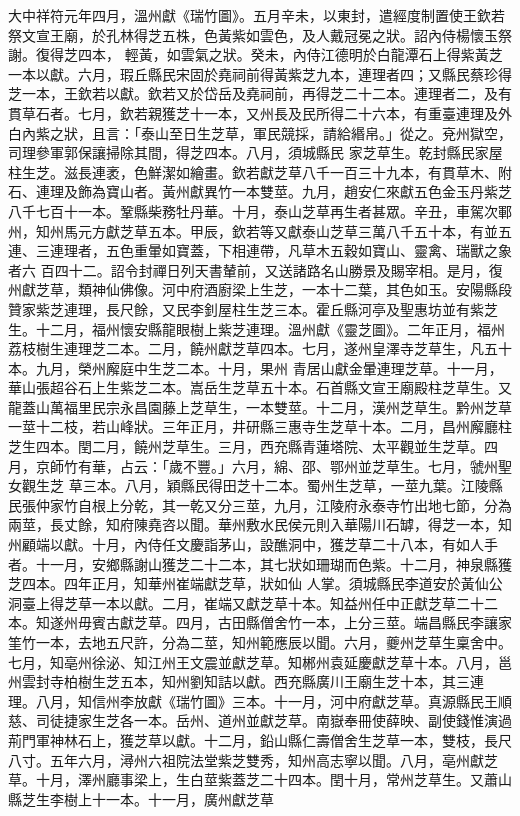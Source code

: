 \begin{pinyinscope}
 大中祥符元年四月，溫州獻《瑞竹圖》。五月辛未，以東封，遣經度制置使王欽若祭文宣王廟，於孔林得芝五株，色黃紫如雲色，及人戴冠冕之狀。詔內侍楊懷玉祭謝。復得芝四本，
 輕黃，如雲氣之狀。癸未，內侍江德明於白龍潭石上得紫黃芝一本以獻。六月，瑕丘縣民宋固於堯祠前得黃紫芝九本，連理者四；又縣民蔡珍得芝一本，王欽若以獻。欽若又於岱岳及堯祠前，再得芝二十二本。連理者二，及有貫草石者。七月，欽若親獲芝十一本，又州長及民所得二十六本，有重臺連理及外白內紫之狀，且言：「泰山至日生芝草，軍民競採，請給緡帛。」從之。兗州獄空，司理參軍郭保讓掃除其間，得芝四本。八月，須城縣民
 家芝草生。乾封縣民家屋柱生芝。滋長連袤，色鮮潔如繪畫。欽若獻芝草八千一百三十九本，有貫草木、附石、連理及飾為寶山者。黃州獻異竹一本雙莖。九月，趙安仁來獻五色金玉丹紫芝八千七百十一本。鞏縣柴務牡丹華。十月，泰山芝草再生者甚眾。辛丑，車駕次鄆州，知州馬元方獻芝草五本。甲辰，欽若等又獻泰山芝草三萬八千五十本，有並五連、三連理者，五色重暈如寶蓋，下相連帶，凡草木五穀如寶山、靈禽、瑞獸之象者六
 百四十二。詔令封禪日列天書輦前，又送諸路名山勝景及賜宰相。是月，復州獻芝草，類神仙佛像。河中府酒廚梁上生芝，一本十二葉，其色如玉。安陽縣段贊家紫芝連理，長尺餘，又民李釗屋柱生芝三本。霍丘縣河亭及聖惠坊並有紫芝生。十二月，福州懷安縣龍眼樹上紫芝連理。溫州獻《靈芝圖》。二年正月，福州荔枝樹生連理芝二本。二月，饒州獻芝草四本。七月，遂州皇澤寺芝草生，凡五十本。九月，榮州廨庭中生芝二本。十月，果州
 青居山獻金暈連理芝草。十一月，華山張超谷石上生紫芝二本。嵩岳生芝草五十本。石首縣文宣王廟殿柱芝草生。又龍蓋山萬福里民宗永昌園藤上芝草生，一本雙莖。十二月，漢州芝草生。黔州芝草一莖十二枝，若山峰狀。三年正月，井研縣三惠寺生芝草十本。二月，昌州廨廳柱芝生四本。閏二月，饒州芝草生。三月，西充縣青蓮塔院、太平觀並生芝草。四月，京師竹有華，占云：「歲不豐。」六月，綿、邵、鄂州並芝草生。七月，虢州聖女觀生芝
 草三本。八月，穎縣民得田芝十二本。蜀州生芝草，一莖九葉。江陵縣民張仲家竹自根上分乾，其一乾又分三莖，九月，江陵府永泰寺竹出地七節，分為兩莖，長丈餘，知府陳堯咨以聞。華州敷水民侯元則入華陽川石罅，得芝一本，知州顧端以獻。十月，內侍任文慶詣茅山，設醮洞中，獲芝草二十八本，有如人手者。十一月，安鄉縣謝山獲芝二十二本，其七狀如珊瑚而色紫。十二月，神泉縣獲芝四本。四年正月，知華州崔端獻芝草，狀如仙
 人掌。須城縣民李道安於黃仙公洞臺上得芝草一本以獻。二月，崔端又獻芝草十本。知益州任中正獻芝草二十二本。知遂州毋賓古獻芝草。四月，古田縣僧舍竹一本，上分三莖。端昌縣民李讓家筀竹一本，去地五尺許，分為二莖，知州範應辰以聞。六月，夔州芝草生稟舍中。七月，知亳州徐泌、知江州王文震並獻芝草。知郴州袁延慶獻芝草十本。八月，邕州雲封寺柏樹生芝五本，知州劉知詰以獻。西充縣廣川王廟生芝十本，其三連
 理。八月，知信州李放獻《瑞竹圖》三本。十一月，河中府獻芝草。真源縣民王順慈、司徒捷家生芝各一本。岳州、道州並獻芝草。南嶽奉冊使薛映、副使錢惟演過荊門軍神林石上，獲芝草以獻。十二月，鉛山縣仁壽僧舍生芝草一本，雙枝，長尺八寸。五年六月，潯州六祖院法堂紫芝雙秀，知州高志寧以聞。八月，亳州獻芝草。十月，澤州廳事梁上，生白莖紫蓋芝二十四本。閏十月，常州芝草生。又蕭山縣芝生李樹上十一本。十一月，廣州獻芝草

\end{pinyinscope}
